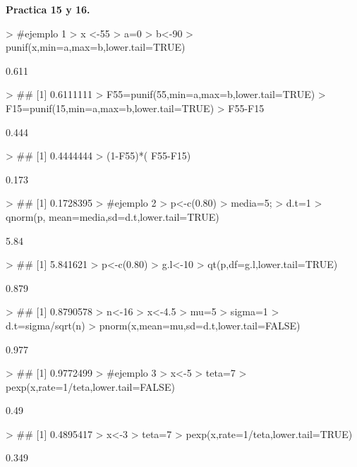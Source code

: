 \documentclass{article}
\begin{document}
\textbf{Practica 15 y 16.}
\begin{Schunk}
\begin{Sinput}
> #ejemplo 1
> x <-55
> a=0
> b<-90
> punif(x,min=a,max=b,lower.tail=TRUE)
\end{Sinput}
\begin{Soutput}
[1] 0.611
\end{Soutput}
\begin{Sinput}
> ## [1] 0.6111111
> F55=punif(55,min=a,max=b,lower.tail=TRUE)
> F15=punif(15,min=a,max=b,lower.tail=TRUE)
> F55-F15
\end{Sinput}
\begin{Soutput}
[1] 0.444
\end{Soutput}
\begin{Sinput}
> ## [1] 0.4444444
> (1-F55)*( F55-F15)
\end{Sinput}
\begin{Soutput}
[1] 0.173
\end{Soutput}
\begin{Sinput}
> ## [1] 0.1728395
> #ejemplo 2
> p<-c(0.80)
> media=5;
> d.t=1
> qnorm(p, mean=media,sd=d.t,lower.tail=TRUE)
\end{Sinput}
\begin{Soutput}
[1] 5.84
\end{Soutput}
\begin{Sinput}
> ## [1] 5.841621
> p<-c(0.80)
> g.l<-10
> qt(p,df=g.l,lower.tail=TRUE)
\end{Sinput}
\begin{Soutput}
[1] 0.879
\end{Soutput}
\begin{Sinput}
> ## [1] 0.8790578
> n<-16
> x<-4.5
> mu=5
> sigma=1
> d.t=sigma/sqrt(n)
> pnorm(x,mean=mu,sd=d.t,lower.tail=FALSE)
\end{Sinput}
\begin{Soutput}
[1] 0.977
\end{Soutput}
\begin{Sinput}
> ## [1] 0.9772499
> #ejemplo 3
> x<-5
> teta=7
> pexp(x,rate=1/teta,lower.tail=FALSE)
\end{Sinput}
\begin{Soutput}
[1] 0.49
\end{Soutput}
\begin{Sinput}
> ## [1] 0.4895417
> x<-3
> teta=7
> pexp(x,rate=1/teta,lower.tail=TRUE)
\end{Sinput}
\begin{Soutput}
[1] 0.349
\end{Soutput}
\begin{Sinput}

\end{Sinput}
\end{Schunk}
\end{document}
